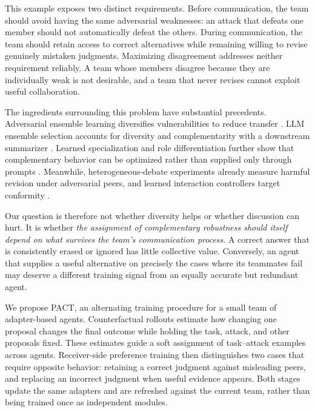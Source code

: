 \documentclass[10pt,twocolumn]{article}
\newcommand{\method}{\textsc{PACT}}
\begin{document}
This example exposes two distinct requirements. Before communication, the team should avoid having the same adversarial weaknesses: an attack that defeats one member should not automatically defeat the others. During communication, the team should retain access to correct alternatives while remaining willing to revise genuinely mistaken judgments. Maximizing disagreement addresses neither requirement reliably. A team whose members disagree because they are individually weak is not desirable, and a team that never revises cannot exploit useful collaboration.

The ingredients surrounding this problem have substantial precedents. Adversarial ensemble learning diversifies vulnerabilities to reduce transfer \citep{pang2019adp,yang2020dverge}. LLM ensemble selection accounts for diversity and complementarity with a downstream summarizer \citep{tekin2024topla,zhang2026mca}. Learned specialization and role differentiation further show that complementary behavior can be optimized rather than supplied only through prompts \citep{cordero2026specialists,li2025mlc}. Meanwhile, heterogeneous-debate experiments already measure harmful revision under adversarial peers, and learned interaction controllers target conformity \citep{nilayam2026heterogeneous,wu2026dear}.

Our question is therefore not whether diversity helps or whether discussion can hurt. It is whether \emph{the assignment of complementary robustness should itself depend on what survives the team's communication process}. A correct answer that is consistently erased or ignored has little collective value. Conversely, an agent that supplies a useful alternative on precisely the cases where its teammates fail may deserve a different training signal from an equally accurate but redundant agent.

We propose \method{}, an alternating training procedure for a small team of adapter-based agents. Counterfactual rollouts estimate how changing one proposal changes the final outcome while holding the task, attack, and other proposals fixed. These estimates guide a soft assignment of task--attack examples across agents. Receiver-side preference training then distinguishes two cases that require opposite behavior: retaining a correct judgment against misleading peers, and replacing an incorrect judgment when useful evidence appears. Both stages update the same adapters and are refreshed against the current team, rather than being trained once as independent modules.
\end{document}
